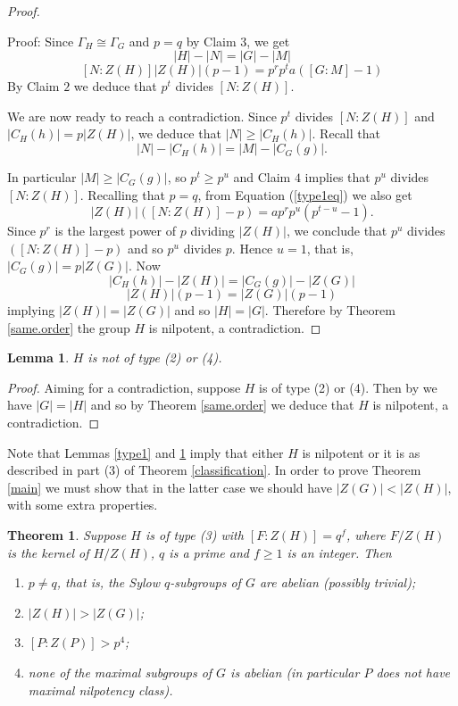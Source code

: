 \documentclass[12pt]{amsart}
\theoremstyle{definition}
\theoremstyle{remark}
\theoremstyle{plain}
\theoremstyle{plain}
\theoremstyle{plain}
\theoremstyle{plain}
\newtheorem{lemma}[definition]{Lemma}
\theoremstyle{plain}
\newtheorem{theorem}[definition]{Theorem}
\theoremstyle{remark}
\theoremstyle{remark}
\theoremstyle{definition}
\begin{document}
\begin{proof}
\begin{description}
\smallskip
\noindent
Proof: Since $\Gamma_H \cong \Gamma_G$ and $p=q$ by Claim $3$, we get
\[ |H| - |N| = |G| - |M|\]
\[[N \colon Z(H)]|Z(H)|(p - 1) = p^rp^ta ([G \colon M] - 1)\]
By Claim $2$ we deduce that $p^t$ divides $[N \colon Z(H)]$. 
\end{description}

We are now ready to reach a contradiction.
Since $p^t$ divides $[N \colon Z(H)]$ and $|C_H(h)|=p|Z(H)|$, we deduce that $|N| \geq |C_H(h)|$. 
 Recall that 
\begin{equation}\label{type1eq} |N| - |C_H(h)| = |M| - |C_G(g)|.\end{equation}

In particular  $|M| \geq |C_G(g)|$, so $p^t \geq p^u$ and Claim $4$ implies that $p^u$ divides $[N \colon Z(H)]$. Recalling that $p=q$, from Equation (\ref{type1eq}) we also get
\[ |Z(H)|([N \colon Z(H)] - p) = ap^rp^u(p^{t-u} - 1).\]
Since $p^r$ is the largest power of $p$ dividing $|Z(H)|$, we conclude that $p^u$ divides $([N \colon Z(H)] - p)$ and so $p^u$ divides $p$. Hence $u=1$, that is, $|C_G(g)| = p|Z(G)|$. Now
\[ |C_H(h)| - |Z(H)| = |C_G(g)| - |Z(G)| \] 
\[ |Z(H)|(p-1) = |Z(G)|(p-1) \]
implying $|Z(H)| = |Z(G)|$ and so $|H| = |G|$.
Therefore by Theorem \ref{same.order}  the group $H$ is nilpotent, a contradiction.

\end{proof}

\begin{lemma}\label{type2.4}
$H$ is not of type (2) or (4).
\end{lemma}

\begin{proof}
Aiming for a contradiction, suppose $H$ is of type (2) or (4). Then by \cite[Lemma 3.11 and 3.12]{AAM} we have $|G|=|H|$ and so by Theorem \ref{same.order} we deduce that $H$ is nilpotent, a contradiction.
\end{proof}


Note that Lemmas \ref{type1} and \ref{type2.4} imply that either $H$ is nilpotent or it is as described in part (3) of Theorem \ref{classification}.
In order to prove Theorem \ref{main} we must show that in the latter case we should have $|Z(G)| < |Z(H)|$, with some extra properties. 

\begin{theorem}\label{exception} 
Suppose $H$ is of type (3) with $[F \colon Z(H)] = q^f$, where $F/Z(H)$ is the kernel of $H/Z(H)$, $q$ is a prime and $f\geq 1$ is an integer. Then
\begin{enumerate}
\item $p \neq q$, that is, the Sylow $q$-subgroups of $G$ are abelian (possibly trivial);
\item $|Z(H)| > |Z(G)|$;
\item $[P \colon Z(P)] > p^4$;
\item none of the maximal subgroups of $G$ is abelian (in particular $P$ does not have maximal nilpotency class). 
\end{enumerate}
\end{theorem}
\end{document}
